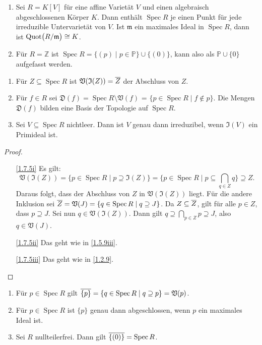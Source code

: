 \documentclass[a4paper,12pt]{scrbook}
\theoremstyle{keinenummern} %
\theoremstyle{mitnummern}
\theoremstyle{unserbeweis}
\newtheorem{proof}{Beweis}
\def\V{\mathfrak{V}}
\def\I{\mathfrak{I}}
\def\P{\mathbb{P}}
\newcommand{\D}{\mathfrak{D}}
\def\m{\mathfrak{m}}
\newcommand{\Spec}{\operatorname{Spec}}
\newcommand{\Quot}{\operatorname{Quot}}
\newcommand{\set}[1]{\ensuremath{\mathbb{#1}}}
\newcommand{\Z}{\set{Z}}
\def\Bar#1{\ensuremath\overline{#1}}
\newcommand{\Quotient}[2]{
  \mathchoice
  { %
    \raisebox{0.7ex}{\ensuremath{#1}}
    \ensuremath{\mkern-3mu}\big/\ensuremath{\mkern-3mu}
    \raisebox{-0.6ex}{\ensuremath{#2}}
  }
  { %
    #1/#2
  }
  { %
    #1/#2
  }
  { %
    #1/#2
  }
}
\begin{document}
\begin{bsp}\label{1.7.4}
  \begin{enumerate}
  \item{} Sei $R=K[V]$ für eine affine Varietät $V$ und einen algebraisch abgeschlossenen Körper $K$. Dann enthält
    $\Spec R$ je einen Punkt für jede irreduzible Untervarietät von $V$. Ist $\m$ ein maximales Ideal in $\Spec R$, dann ist
    $\Quot\bigl(\Quotient{R}{\m}\bigr)\cong K$.
  \item{} Für $R=\Z$ ist $\Spec R = \{(p)\mid p\in\P\}\cup\{(0)\}$, kann also als $\P\cup\{0\}$ aufgefasst werden.
  \end{enumerate}
\end{bsp}

\begin{bem}\label{1.7.5}
  \begin{enumerate}
  \item{} Für $Z\subseteq\Spec R$ ist $\V(\I(Z))=\Bar{Z}$ der Abschluss von $Z$.
  \item{} Für $f\in R$ sei $\D(f)=\Spec R\setminus\V(f)$ = $\{p\in\Spec R\mid f\notin p\}$. Die Mengen $\D(f)$
    bilden eine Basis der Topologie auf $\Spec R$.
  \item{} Sei $V\subseteq\Spec R$ nichtleer. Dann ist $V$ genau dann irreduzibel, wenn $\I(V)$ ein Primideal ist.
  \end{enumerate}
\end{bem}
\begin{proof}
  \begin{enumerate}
  \item[\ref{1.7.5i}] Es gilt:\vspace*{-6pt}
  \[\V(\I(Z))=\{p\in\Spec R\mid p\supseteq\I(Z)\} = \{p\in\Spec R\mid p\subseteq\bigcap_{q\in Z}q\}\supseteq Z.\]
    Daraus folgt, dass der Abschluss von $Z$ in $\V(\I(Z))$ liegt. Für die andere Inklusion sei
    $\Bar{Z}=\V(J)=\{q\in\Spec R\mid q\supseteq J\}$. Da $Z\subseteq\Bar{Z}$, gilt für alle $p\in Z$, dass $p\supseteq J$. Sei
    nun $q\in\V(\I(Z))$. Dann gilt $q\supseteq\bigcap_{p\in Z}p\supseteq J$, also $q\in\V(J)$.
  \item[\ref{1.7.5ii}] Das geht wie in \cref{1.5.9iii}.
  \item[\ref{1.7.5iii}] Das geht wie in \cref{1.2.9}.
  \end{enumerate}
\end{proof}

\begin{bem}\label{1.7.6}
  \begin{enumerate}
  \item{} Für $p\in\Spec R$ gilt $\Bar{\{p\}}=\{q\in\Spec R\mid q\supseteq p\}=\V(p)$.
  \item{} Für $p\in\Spec R$ ist $\{p\}$ genau dann abgeschlossen, wenn $p$ ein maximales Ideal ist.
  \item{} Sei $R$ nullteilerfrei. Dann gilt $\Bar{\{(0)\}}=\Spec R$.
  \end{enumerate}
\end{bem}
\end{document}
